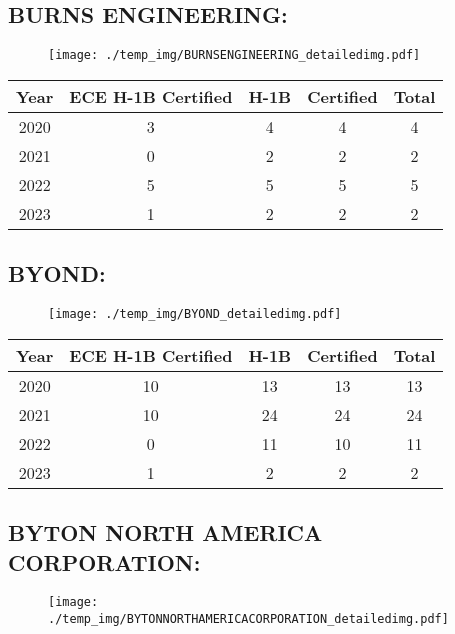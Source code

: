 \documentclass{article}%
\begin{document}
%
\newpage%
\subsection{BURNS ENGINEERING:}%
\label{subsec:BURNSENGINEERING}%
\label{BURNSENGINEERINGdetailed}%


\begin{figure}[htbp]%
\centering%
\texttt{[image: ./temp\_img/BURNSENGINEERING\_detailedimg.pdf]}%
\end{figure}

%
\begin{longtable}{c|c|c|c|c}%
\hline%
Year&ECE H{-}1B Certified&H{-}1B&Certified&Total\\%
\hline%
2020&3&4&4&4\\%
\hline%
2021&0&2&2&2\\%
\hline%
2022&5&5&5&5\\%
\hline%
2023&1&2&2&2\\%
\hline%
\end{longtable}

%
\newpage%
\subsection{BYOND:}%
\label{subsec:BYOND}%
\label{BYONDdetailed}%


\begin{figure}[htbp]%
\centering%
\texttt{[image: ./temp\_img/BYOND\_detailedimg.pdf]}%
\end{figure}

%
\begin{longtable}{c|c|c|c|c}%
\hline%
Year&ECE H{-}1B Certified&H{-}1B&Certified&Total\\%
\hline%
2020&10&13&13&13\\%
\hline%
2021&10&24&24&24\\%
\hline%
2022&0&11&10&11\\%
\hline%
2023&1&2&2&2\\%
\hline%
\end{longtable}

%
\newpage%
\subsection{BYTON NORTH AMERICA CORPORATION:}%
\label{subsec:BYTONNORTHAMERICACORPORATION}%
\label{BYTONNORTHAMERICACORPORATIONdetailed}%


\begin{figure}[htbp]%
\centering%
\texttt{[image: ./temp\_img/BYTONNORTHAMERICACORPORATION\_detailedimg.pdf]}%
\end{figure}
\end{document}
